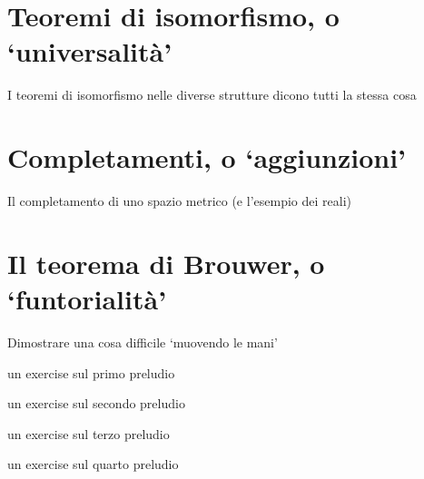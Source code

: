 \section*{Teoremi di isomorfismo, o `universalità'}
I teoremi di isomorfismo nelle diverse strutture dicono tutti la stessa cosa
\section*{Completamenti, o `aggiunzioni'}
Il completamento di uno spazio metrico (e l'esempio dei reali)
\section*{Il teorema di Brouwer, o `funtorialità'}
Dimostrare una cosa difficile `muovendo le mani'
\begin{exercises}
\item \label{ex_prelude_1} un exercise sul primo preludio
\item \label{ex_prelude_2} un exercise sul secondo preludio
\item \label{ex_prelude_3} un exercise sul terzo preludio
\item \label{ex_prelude_4} un exercise sul quarto preludio
\end{exercises}